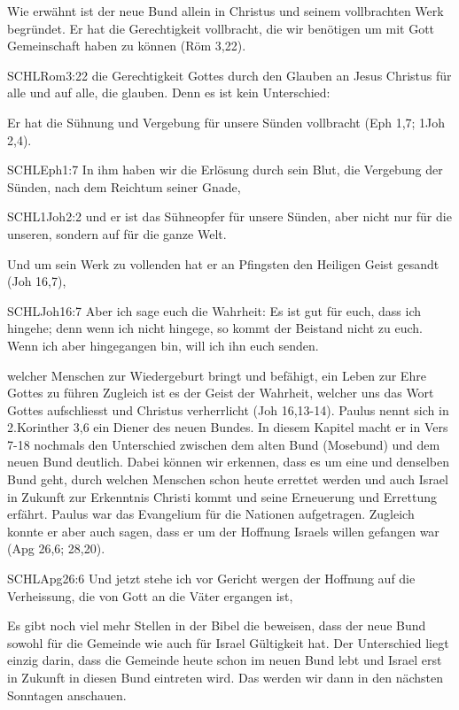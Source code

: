 \begin{otsblock}
        Wie erwähnt ist der neue Bund allein in Christus und seinem vollbrachten Werk begründet. Er hat die Gerechtigkeit vollbracht, die wir benötigen um mit Gott Gemeinschaft haben zu können (Röm 3,22).
        \begin{bibelbox}{SCHL}{Rom}{3:22}
            die Gerechtigkeit Gottes durch den Glauben an Jesus Christus für alle und auf alle, die glauben. Denn es ist kein Unterschied:
        \end{bibelbox}
        Er hat die Sühnung und Vergebung für unsere Sünden vollbracht (Eph 1,7; 1Joh 2,4).
        \begin{bibelbox}{SCHL}{Eph}{1:7}
            In ihm haben wir die Erlösung durch sein Blut, die Vergebung der Sünden, nach dem Reichtum seiner Gnade,
        \end{bibelbox}
        \begin{bibelbox}{SCHL}{1Joh}{2:2}
            und er ist das Sühneopfer für unsere Sünden, aber nicht nur für die unseren, sondern auf für die ganze Welt.
        \end{bibelbox}
        Und um sein Werk zu vollenden hat er an Pfingsten den Heiligen Geist gesandt (Joh 16,7),
        \begin{bibelbox}{SCHL}{Joh}{16:7}
            Aber ich sage euch die Wahrheit: Es ist gut für euch, dass ich hingehe; denn wenn ich nicht hingege, so kommt der Beistand nicht zu euch. Wenn ich aber hingegangen bin, will ich ihn euch senden.
        \end{bibelbox}
        welcher Menschen zur Wiedergeburt bringt und befähigt, ein Leben zur Ehre Gottes zu führen Zugleich ist es der Geist der Wahrheit, welcher uns das Wort Gottes aufschliesst und Christus verherrlicht (Joh 16,13-14). Paulus nennt sich in 2.Korinther 3,6 ein Diener des neuen Bundes. In diesem Kapitel macht er in Vers 7-18 nochmals den Unterschied zwischen dem alten Bund (Mosebund) und dem neuen Bund deutlich. Dabei können wir erkennen, dass es um eine und denselben Bund geht, durch welchen Menschen schon heute errettet werden und auch Israel in Zukunft zur Erkenntnis Christi kommt und seine Erneuerung und Errettung erfährt. Paulus war das Evangelium für die Nationen aufgetragen. Zugleich konnte er aber auch sagen, dass er um der Hoffnung Israels willen gefangen war (Apg 26,6; 28,20).
        \begin{bibelbox}{SCHL}{Apg}{26:6}
            Und jetzt stehe ich vor Gericht wergen der Hoffnung auf die Verheissung, die von Gott an die Väter ergangen ist,
        \end{bibelbox}
        Es gibt noch viel mehr Stellen in der Bibel die beweisen, dass der neue Bund sowohl für die Gemeinde wie auch für Israel Gültigkeit hat. Der Unterschied liegt einzig darin, dass die Gemeinde heute schon im neuen Bund lebt und Israel erst in Zukunft in diesen Bund eintreten wird. Das werden wir dann in den nächsten Sonntagen anschauen.

    \end{otsblock}

